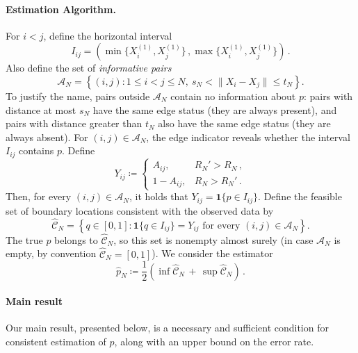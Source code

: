 \documentclass[ECP,preprint]{ejpecp} %
\newcommand{\1}{\mathbf 1}
\newcommand{\cA}{\mathcal A}
\newcommand{\cC}{\mathcal C}
\begin{document}
\paragraph{Estimation Algorithm.}

For \(i<j\), define the horizontal interval
\[
    I_{ij}
    =
    \left(
        \min\{ X_i^{(1)},X_j^{(1)} \} \, ,
        \max\{ X_i^{(1)},X_j^{(1)} \}
    \right) \, .
\]
Also define the set of \emph{informative pairs}
\[
    \cA_N
    =
    \left\{
        (i,j): 1 \le i < j \le N, \  s_N<\|X_i-X_j\|\le t_N
    \right\}.
\]
To justify the name, pairs outside \(\cA_N\) contain no information about \(p\): pairs with distance at most \(s_N\) have the same edge status (they are always present), and pairs with distance greater than \(t_N\) also have the same edge status (they are always absent).
%
For \((i,j)\in\cA_N\), the edge indicator reveals whether the interval \(I_{ij}\) contains \(p\).  Define
\[
    Y_{ij}
    \coloneqq
    \begin{cases}
        A_{ij},   &  R_N' > R_N \,  , \\
        1-A_{ij}, &  R_N  > R_N' \, .
\end{cases}
\]
Then, for every \((i,j)\in\cA_N\), it holds that
\(
    Y_{ij}
    =
    \1\{p\in I_{ij}\}.
\)
%
Define the feasible set of boundary locations consistent with the observed data by
\[
    \widehat{\cC}_N
    =
    \left\{
        q\in [0,1] :
        \1\{q\in I_{ij}\}=Y_{ij}
        \text{ for every }(i,j)\in\cA_N
    \right\}.
\]
The true \(p\) belongs to \(\widehat{\cC}_N\), so this set is nonempty almost surely (in case $\mathcal{A}_N$ is empty, by convention $\widehat{\cC}_N=[0,1]$).%
We consider the estimator
\[
    \widehat p_N
    \coloneqq
    \frac12
    \left(
        \inf\widehat{\cC}_N \, + \,  \sup\widehat{\cC}_N
    \right) \, .
\]




\paragraph{Main result}
Our main result, presented below, is a necessary and sufficient condition for consistent estimation of $p$, along with an upper bound on the error rate.

\medskip 
\end{document}
